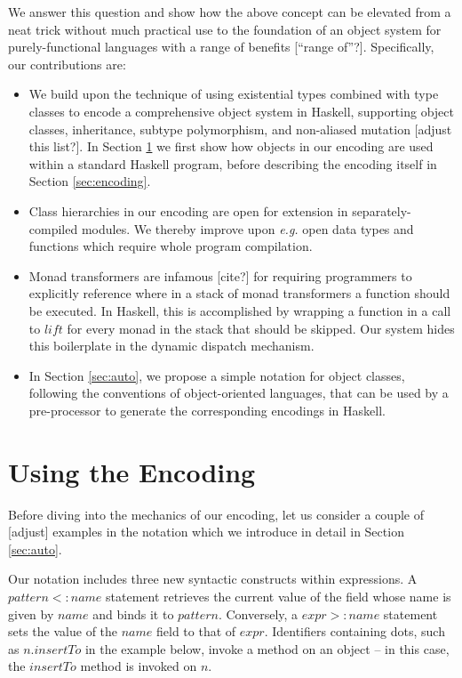 \documentclass[runningheads,a4paper]{llncs}
\newcommand{\todo}[1]{[{\color{blue}#1}]}
\begin{document}
We answer this question and show how the above concept can be elevated from a neat trick without much practical use to the foundation of an object system for purely-functional languages with a range of benefits \todo{``range of''?}. Specifically, our contributions are:
\begin{itemize}
\item We build upon the technique of using existential types combined with type classes to encode a comprehensive object system in Haskell, supporting object classes, inheritance, subtype polymorphism, and non-aliased mutation \todo{adjust this list?}. In Section \ref{sec:usage} we first show how objects in our encoding are used within a standard Haskell program, before describing the encoding itself in Section \ref{sec:encoding}.
\item Class hierarchies in our encoding are open for extension in separately-compiled modules. We thereby improve upon \emph{e.g.} open data types and functions \cite{loh2006open} which require whole program compilation.
\item \todo{Alan: monad stacks?}Monad transformers are infamous \todo{cite?} for requiring programmers to explicitly reference where in a stack of monad transformers a function should be executed. In Haskell, this is accomplished by wrapping a function in a call to $\mathit{lift}$ for every monad in the stack that should be skipped. Our system hides this boilerplate in the dynamic dispatch mechanism. 
\item In Section \ref{sec:auto}, we propose a simple notation for object classes, following the conventions of object-oriented languages, that can be used by a pre-processor to generate the corresponding encodings in Haskell.
\end{itemize}

\section{Using the Encoding}
\label{sec:usage}

Before diving into the mechanics of our encoding, let us consider a couple of \todo{adjust} examples in the notation which we introduce in detail in Section \ref{sec:auto}. 

Our notation includes three new syntactic constructs within expressions. A $\mathit{pattern} <: \mathit{name}$ statement retrieves the current value of the field whose name is given by $\mathit{name}$ and binds it to $\mathit{pattern}$. Conversely, a $\mathit{expr} >: \mathit{name}$ statement sets the value of the $\mathit{name}$ field to that of $\mathit{expr}$. Identifiers containing dots, such as $n.\mathit{insertTo}$ in the example below, invoke a method on an object -- in this case, the $\mathit{insertTo}$ method is invoked on $n$.
\end{document}
